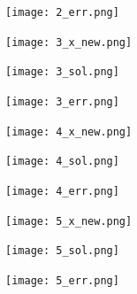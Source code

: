 \documentclass{paper1}
\begin{document}
\begin{figure}
\begin{subfigure}[b]{.95\textwidth}
\begin{subfigure}[b]{0.32\textwidth}
                  \texttt{[image: 2\_err.png]}
          \end{subfigure}%
    \end{subfigure}
    \begin{subfigure}[b]{.95\textwidth}
          \centering
          \begin{subfigure}[b]{0.32\textwidth}
                  \centering
                  \texttt{[image: 3\_x\_new.png]}
          \end{subfigure}%
          \begin{subfigure}[b]{0.32\textwidth}
                  \centering
                  \texttt{[image: 3\_sol.png]}
          \end{subfigure}
          \begin{subfigure}[b]{0.32\textwidth}
                  \centering
                  \texttt{[image: 3\_err.png]}
          \end{subfigure}
    \end{subfigure}
    \begin{subfigure}[b]{.95\textwidth}
          \centering
          \begin{subfigure}[b]{0.32\textwidth}
                  \centering
                  \texttt{[image: 4\_x\_new.png]}
          \end{subfigure}%
          \begin{subfigure}[b]{0.32\textwidth}
                  \centering
                  \texttt{[image: 4\_sol.png]}
          \end{subfigure}
          \begin{subfigure}[b]{0.32\textwidth}
                  \centering
                  \texttt{[image: 4\_err.png]}
          \end{subfigure}%
    \end{subfigure}
    \begin{subfigure}[b]{.95\textwidth}
          \centering
          \begin{subfigure}[b]{0.32\textwidth}
                  \centering
                  \texttt{[image: 5\_x\_new.png]}
          \end{subfigure}%
          \begin{subfigure}[b]{0.32\textwidth}
                  \centering
                  \texttt{[image: 5\_sol.png]}
          \end{subfigure}
          \begin{subfigure}[b]{0.32\textwidth}
                  \centering
                  \texttt{[image: 5\_err.png]}
          \end{subfigure}
    \end{subfigure}
\end{figure}
\end{document}
